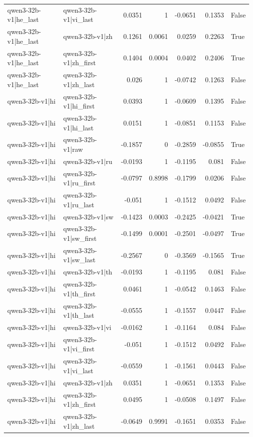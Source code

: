 \begin{table}
\begin{tabular}{l l r r r r l}
qwen3-32b-v1|he_last & qwen3-32b-v1|vi_last & 0.0351 & 1 & -0.0651 & 0.1353 & False \\
qwen3-32b-v1|he_last & qwen3-32b-v1|zh & 0.1261 & 0.0061 & 0.0259 & 0.2263 & True \\
qwen3-32b-v1|he_last & qwen3-32b-v1|zh_first & 0.1404 & 0.0004 & 0.0402 & 0.2406 & True \\
qwen3-32b-v1|he_last & qwen3-32b-v1|zh_last & 0.026 & 1 & -0.0742 & 0.1263 & False \\
qwen3-32b-v1|hi & qwen3-32b-v1|hi_first & 0.0393 & 1 & -0.0609 & 0.1395 & False \\
qwen3-32b-v1|hi & qwen3-32b-v1|hi_last & 0.0151 & 1 & -0.0851 & 0.1153 & False \\
qwen3-32b-v1|hi & qwen3-32b-v1|raw & -0.1857 & 0 & -0.2859 & -0.0855 & True \\
qwen3-32b-v1|hi & qwen3-32b-v1|ru & -0.0193 & 1 & -0.1195 & 0.081 & False \\
qwen3-32b-v1|hi & qwen3-32b-v1|ru_first & -0.0797 & 0.8998 & -0.1799 & 0.0206 & False \\
qwen3-32b-v1|hi & qwen3-32b-v1|ru_last & -0.051 & 1 & -0.1512 & 0.0492 & False \\
qwen3-32b-v1|hi & qwen3-32b-v1|sw & -0.1423 & 0.0003 & -0.2425 & -0.0421 & True \\
qwen3-32b-v1|hi & qwen3-32b-v1|sw_first & -0.1499 & 0.0001 & -0.2501 & -0.0497 & True \\
qwen3-32b-v1|hi & qwen3-32b-v1|sw_last & -0.2567 & 0 & -0.3569 & -0.1565 & True \\
qwen3-32b-v1|hi & qwen3-32b-v1|th & -0.0193 & 1 & -0.1195 & 0.081 & False \\
qwen3-32b-v1|hi & qwen3-32b-v1|th_first & 0.0461 & 1 & -0.0542 & 0.1463 & False \\
qwen3-32b-v1|hi & qwen3-32b-v1|th_last & -0.0555 & 1 & -0.1557 & 0.0447 & False \\
qwen3-32b-v1|hi & qwen3-32b-v1|vi & -0.0162 & 1 & -0.1164 & 0.084 & False \\
qwen3-32b-v1|hi & qwen3-32b-v1|vi_first & -0.051 & 1 & -0.1512 & 0.0492 & False \\
qwen3-32b-v1|hi & qwen3-32b-v1|vi_last & -0.0559 & 1 & -0.1561 & 0.0443 & False \\
qwen3-32b-v1|hi & qwen3-32b-v1|zh & 0.0351 & 1 & -0.0651 & 0.1353 & False \\
qwen3-32b-v1|hi & qwen3-32b-v1|zh_first & 0.0495 & 1 & -0.0508 & 0.1497 & False \\
qwen3-32b-v1|hi & qwen3-32b-v1|zh_last & -0.0649 & 0.9991 & -0.1651 & 0.0353 & False \\

\end{tabular}
\end{table}
